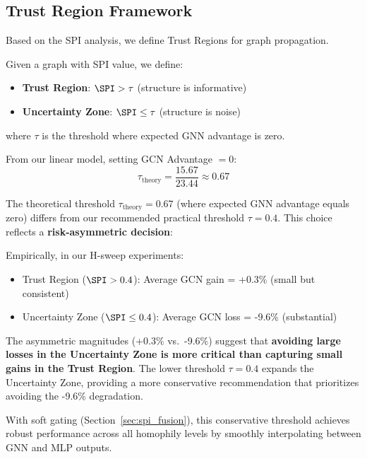 \subsection{Trust Region Framework}

Based on the SPI analysis, we define Trust Regions for graph propagation.

\begin{definition}
Given a graph with SPI value, we define:
\begin{itemize}
    \item \textbf{Trust Region}: $\SPI > \tau$ (structure is informative)
    \item \textbf{Uncertainty Zone}: $\SPI \leq \tau$ (structure is noise)
\end{itemize}
where $\tau$ is the threshold where expected GNN advantage is zero.
\end{definition}

From our linear model, setting GCN Advantage $= 0$:
\begin{equation}
    \tau_{\text{theory}} = \frac{15.67}{23.44} \approx 0.67
\end{equation}

\begin{remark}
\label{rem:threshold_selection}
The theoretical threshold $\tau_{\text{theory}} = 0.67$ (where expected GNN advantage equals zero) differs from our recommended practical threshold $\tau = 0.4$. This choice reflects a \textbf{risk-asymmetric decision}:

Empirically, in our H-sweep experiments:
\begin{itemize}
    \item Trust Region ($\SPI > 0.4$): Average GCN gain = +0.3\% (small but consistent)
    \item Uncertainty Zone ($\SPI \leq 0.4$): Average GCN loss = -9.6\% (substantial)
\end{itemize}

The asymmetric magnitudes (+0.3\% vs.\ -9.6\%) suggest that \textbf{avoiding large losses in the Uncertainty Zone is more critical than capturing small gains in the Trust Region}. The lower threshold $\tau = 0.4$ expands the Uncertainty Zone, providing a more conservative recommendation that prioritizes avoiding the -9.6\% degradation.

With soft gating (Section~\ref{sec:spi_fusion}), this conservative threshold achieves robust performance across all homophily levels by smoothly interpolating between GNN and MLP outputs.
\end{remark}

